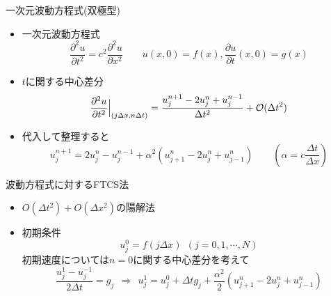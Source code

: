 \begin{frame}[t]{一次元波動方程式(双極型)}
  \begin{itemize}
  \item 一次元波動方程式
    \[
    \frac{\partial^2 u}{\partial t^2} = c^2 \frac{\partial^2 u}{\partial x^2} \qquad u(x,0)=f(x), \frac{\partial u}{\partial t} (x,0) = g(x)
    \]
  \item $t$に関する中心差分
    \[
    \frac{\partial^2 u}{\partial t^2} \Big|_{(j \Delta x, n \Delta t)} = \frac{u_{j}^{n+1} - 2 u_{j}^{n} + u_{j}^{n-1}}{\Delta t^2} + {\cal O}(\Delta t^2)
    \]
  \item 代入して整理すると
    \[
    u_{j}^{n+1} = 2u_{j}^{n} - u_{j}^{n-1} + \alpha^2 (u_{j+1}^{n} - 2 u_{j}^{n} + u_{j-1}^{n}) \qquad (\alpha = c\frac{\Delta t}{\Delta x})
    \]
  \end{itemize}
\end{frame}

\begin{frame}[t]{波動方程式に対するFTCS法}
  \begin{itemize}
  \item $O(\Delta t^2) + O(\Delta x^2)$の陽解法
    \begin{center}
    \end{center}
  \item 初期条件
    \[
    u_j^0 = f(j\Delta x) \ \ (j=0,1,\cdots,N)
    \]
    初期速度については$n=0$に関する中心差分を考えて
    \[
    \frac{u_j^1 - u_j^{-1}}{2 \Delta t} = g_j \ \ \Rightarrow \ \ u_j^1 = u_j^0 + \Delta t g_j + \frac{\alpha^2}{2} (u_{j+1}^{n} - 2 u_{j}^{n} + u_{j-1}^{n})
    \]
  \end{itemize}
\end{frame}

